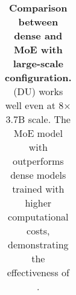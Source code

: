 \begin{table}[t]
\begin{adjustbox}{width=\linewidth}
\begin{tabular}{cllrrrr*{13}{r}}

\bottomrule
\end{tabular}
\end{adjustbox}
\end{table}

\begin{table}[t]
\caption{\textbf{Comparison between dense and MoE with large-scale configuration.}
\methodname{} (DU) works well even at 8$\times$3.7B scale. The MoE model with \methodname{} outperforms dense models trained with higher computational costs, demonstrating the effectiveness of \methodname{}.
}

\tabcolsep 3pt%
\label{tab:detailed-ja-en-comparison_method_scaling}
\centering
\small
\renewcommand{\arraystretch}{1.3}
\begin{adjustbox}{width=\linewidth}
\begin{tabular}{cllrrrrrr*{13}{r}}
\toprule


\end{tabular}
\end{adjustbox}
\end{table}

